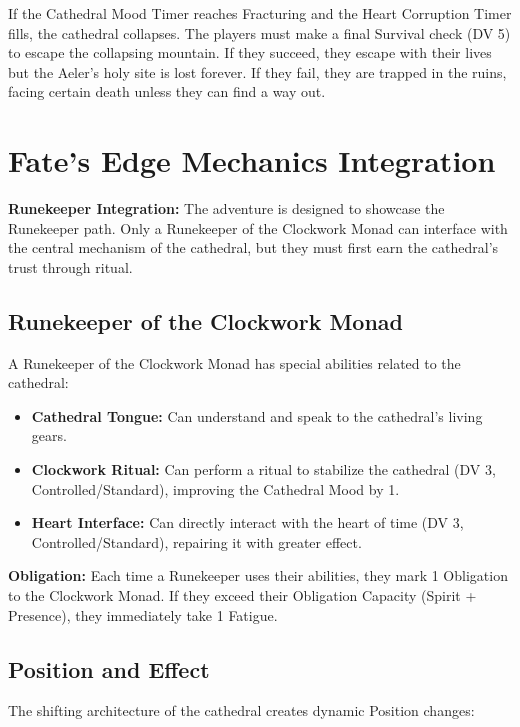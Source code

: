\documentclass{article}
\begin{document}
If the Cathedral Mood Timer reaches Fracturing and the Heart Corruption Timer fills, the cathedral collapses. The players must make a final Survival check (DV 5) to escape the collapsing mountain. If they succeed, they escape with their lives but the Aeler's holy site is lost forever. If they fail, they are trapped in the ruins, facing certain death unless they can find a way out.

\section{Fate's Edge Mechanics Integration}

\begin{mechanicbox}
\textbf{Runekeeper Integration:} The adventure is designed to showcase the Runekeeper path. Only a Runekeeper of the Clockwork Monad can interface with the central mechanism of the cathedral, but they must first earn the cathedral's trust through ritual.
\end{mechanicbox}

\subsection{Runekeeper of the Clockwork Monad}

A Runekeeper of the Clockwork Monad has special abilities related to the cathedral:

\begin{itemize}
    \item \textbf{Cathedral Tongue:} Can understand and speak to the cathedral's living gears.
    \item \textbf{Clockwork Ritual:} Can perform a ritual to stabilize the cathedral (DV 3, Controlled/Standard), improving the Cathedral Mood by 1.
    \item \textbf{Heart Interface:} Can directly interact with the heart of time (DV 3, Controlled/Standard), repairing it with greater effect.
\end{itemize}

\textbf{Obligation:} Each time a Runekeeper uses their abilities, they mark 1 Obligation to the Clockwork Monad. If they exceed their Obligation Capacity (Spirit + Presence), they immediately take 1 Fatigue.

\subsection{Position and Effect}

The shifting architecture of the cathedral creates dynamic Position changes:
\end{document}
